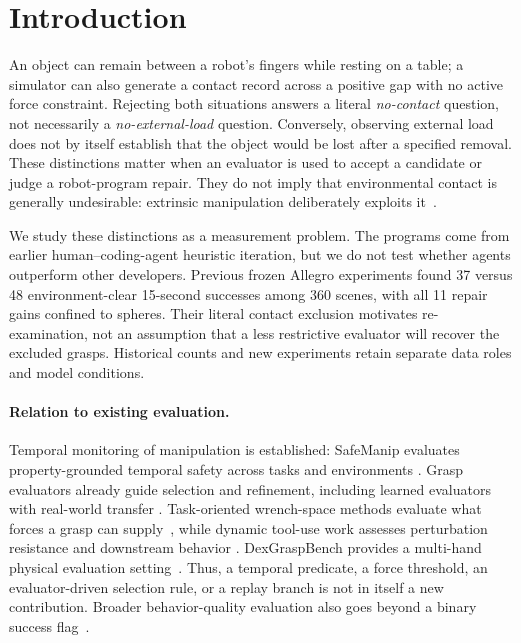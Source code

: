 \section{Introduction}
An object can remain between a robot's fingers while resting on a table; a
simulator can also generate a contact record across a positive gap with no
active force constraint. Rejecting both situations answers a literal
\emph{no-contact} question, not necessarily a \emph{no-external-load} question.
Conversely, observing external load does not by itself establish that the
object would be lost after a specified removal. These distinctions matter when
an evaluator is used to accept a candidate or judge a robot-program repair.
They do not imply that environmental contact is generally undesirable:
extrinsic manipulation deliberately exploits it~\citep{extrinsic2014}.

We study these distinctions as a measurement problem. The programs come from
earlier human--coding-agent heuristic iteration, but we do not test whether
agents outperform other developers. Previous frozen Allegro experiments found
37 versus 48 environment-clear 15-second successes among 360 scenes, with all
11 repair gains confined to spheres. Their literal contact exclusion motivates
re-examination, not an assumption that a less restrictive evaluator will
recover the excluded grasps. Historical counts and new experiments retain
separate data roles and model conditions.

\paragraph{Relation to existing evaluation.}
Temporal monitoring of manipulation is established: SafeManip evaluates
property-grounded temporal safety across tasks and environments
\citep{huang2026safemanip}. Grasp evaluators already guide selection and
refinement, including learned evaluators with real-world transfer
\citep{lum2025getagrip}. Task-oriented wrench-space methods evaluate what
forces a grasp can supply~\citep{chen2023task}, while dynamic tool-use work
assesses perturbation resistance and downstream behavior
\citep{grasp_to_act2026}. DexGraspBench provides a multi-hand physical
evaluation setting~\citep{chen2025bodex,dexgraspbench}. Thus, a temporal
predicate, a force threshold, an evaluator-driven selection rule, or a replay
branch is not in itself a new contribution. Broader behavior-quality evaluation
also goes beyond a binary success flag~\citep{eval_actions2026}.

